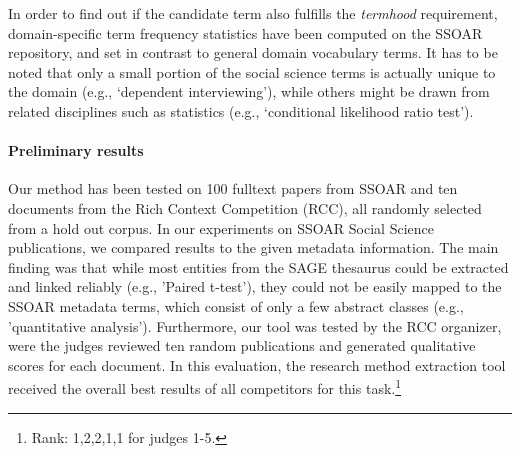 In order to find out if the candidate term also fulfills the \textit{termhood} requirement, domain-specific term frequency statistics have been computed on the SSOAR repository, and set in contrast to general domain vocabulary terms. 
It has to be noted that only a small portion of the social science terms is actually unique to the domain (e.g., `dependent interviewing'), while others might be drawn from related disciplines such as statistics (e.g., `conditional likelihood ratio test').


\paragraph{Preliminary results}%
Our method has been tested on 100 fulltext papers from SSOAR and ten documents from the Rich Context Competition (RCC), all randomly selected from a hold out corpus.
In our experiments on SSOAR Social Science publications, we compared results to the given metadata information.
The main finding was that while most entities from the SAGE thesaurus could be extracted and linked reliably (e.g., 'Paired t-test'), they could not be easily mapped to the SSOAR metadata terms, which consist of only a few abstract classes (e.g., 'quantitative analysis').
Furthermore, our tool was tested by the RCC organizer, were the judges reviewed ten random publications and generated qualitative scores for each document.
In this evaluation, the research method extraction tool received the overall best results of all competitors for this task.\footnote{Rank: 1,2,2,1,1 for judges 1-5.}




